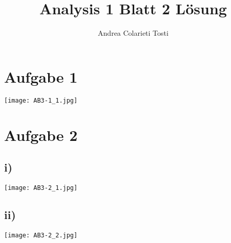 \documentclass[14pt,a4paper,landscape]{article}
\author{Andrea Colarieti Tosti}
\title{Analysis 1 Blatt 2 Lösung}
\begin{document}
\maketitle \newpage
\section*{Aufgabe 1}
\texttt{[image: AB3-1\_1.jpg]} 
\section*{Aufgabe 2}
\subsection*{i)}
\texttt{[image: AB3-2\_1.jpg]}
\subsection*{ii)}
\texttt{[image: AB3-2\_2.jpg]} 
\end{document}
